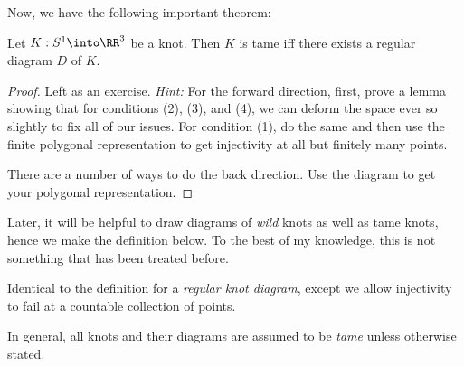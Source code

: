 Now, we have the following important theorem:
\begin{theorem}
  Let $K : S^1 \into \RR^3$ be a knot. Then $K$ is tame iff there
  exists a regular diagram $D$ of $K$.
\end{theorem}
\begin{proof}
  Left as an exercise. \emph{Hint:} For the forward direction, first,
  prove a lemma showing that for conditions (2), (3), and (4), we can
  deform the space ever so slightly to fix all of our issues. For
  condition (1), do the same and then use the finite polygonal
  representation to get injectivity at all but finitely many points.

  There are a number of ways to do the back direction. Use the diagram
  to get your polygonal representation.
\end{proof}
Later, it will be helpful to draw diagrams of \emph{wild} knots as
well as tame knots, hence we make the definition below. To the best of
my knowledge, this is not something that has been treated before.
\begin{definition}
  Identical to the definition for a \emph{regular knot diagram},
  except we allow injectivity to fail at a countable collection of
  points.
\end{definition}
In general, all knots and their diagrams are assumed to be \emph{tame}
unless otherwise stated.
